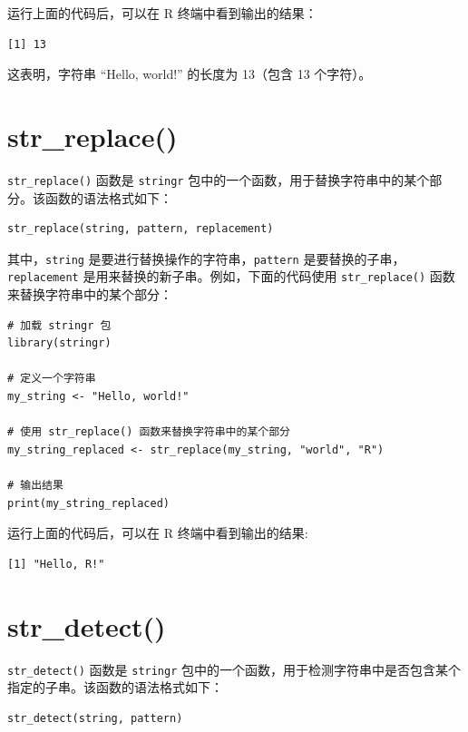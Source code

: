 \documentclass[
  letterpaper,
  DIV=11,
  numbers=noendperiod]{scrreprt}
\begin{document}
运行上面的代码后，可以在 R 终端中看到输出的结果：

\begin{verbatim}
[1] 13
\end{verbatim}

这表明，字符串 ``Hello, world!'' 的长度为 13（包含 13 个字符）。

\hypertarget{str_replace}{%
\section{str\_replace()}\label{str_replace}}

\texttt{str\_replace()} 函数是 \texttt{stringr}
包中的一个函数，用于替换字符串中的某个部分。该函数的语法格式如下：

\begin{verbatim}
str_replace(string, pattern, replacement)
\end{verbatim}

其中，\texttt{string} 是要进行替换操作的字符串，\texttt{pattern}
是要替换的子串，\texttt{replacement}
是用来替换的新子串。例如，下面的代码使用 \texttt{str\_replace()}
函数来替换字符串中的某个部分：

\begin{verbatim}
# 加载 stringr 包
library(stringr)

# 定义一个字符串
my_string <- "Hello, world!"

# 使用 str_replace() 函数来替换字符串中的某个部分
my_string_replaced <- str_replace(my_string, "world", "R")

# 输出结果
print(my_string_replaced)
\end{verbatim}

运行上面的代码后，可以在 R 终端中看到输出的结果:

\begin{verbatim}
[1] "Hello, R!"
\end{verbatim}

\hypertarget{str_detect}{%
\section{str\_detect()}\label{str_detect}}

\texttt{str\_detect()} 函数是 \texttt{stringr}
包中的一个函数，用于检测字符串中是否包含某个指定的子串。该函数的语法格式如下：

\begin{verbatim}
str_detect(string, pattern)
\end{verbatim}
\end{document}
